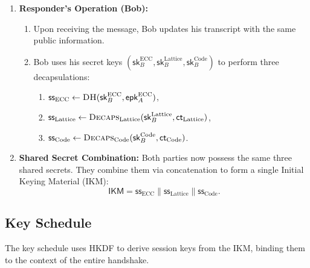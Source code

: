\documentclass[11pt]{article}
\begin{document}
\begin{enumerate}
\begin{enumerate}
    \end{enumerate}
    \item \textbf{Responder's Operation (Bob):}
    \begin{enumerate}
        \item Upon receiving the message, Bob updates his transcript with the same public information.
        \item Bob uses his secret keys $(\mathsf{sk}^{\mathrm{ECC}}_B, \mathsf{sk}^{\mathrm{Lattice}}_B, \mathsf{sk}^{\mathrm{Code}}_B)$ to perform three decapsulations:
        \begin{enumerate}
            \item $\mathsf{ss}_{\mathrm{ECC}} \leftarrow \textsc{DH}(\mathsf{sk}^{\mathrm{ECC}}_B, \mathsf{epk}^{\mathrm{ECC}}_A)$,
            \item $\mathsf{ss}_{\mathrm{Lattice}} \leftarrow \textsc{Decaps}_{\mathrm{Lattice}}(\mathsf{sk}^{\mathrm{Lattice}}_B, \mathsf{ct}_{\mathrm{Lattice}})$,
            \item $\mathsf{ss}_{\mathrm{Code}} \leftarrow \textsc{Decaps}_{\mathrm{Code}}(\mathsf{sk}^{\mathrm{Code}}_B, \mathsf{ct}_{\mathrm{Code}})$.
        \end{enumerate}
    \end{enumerate}
    \item \textbf{Shared Secret Combination:} Both parties now possess the same three shared secrets. They combine them via concatenation to form a single Initial Keying Material (IKM):
    \[
        \mathsf{IKM} = \mathsf{ss}_{\mathrm{ECC}} \parallel \mathsf{ss}_{\mathrm{Lattice}} \parallel \mathsf{ss}_{\mathrm{Code}}.
    \]
\end{enumerate}

\subsection{Key Schedule}
The key schedule uses HKDF to derive session keys from the IKM, binding them to the context of the entire handshake.
\end{document}
